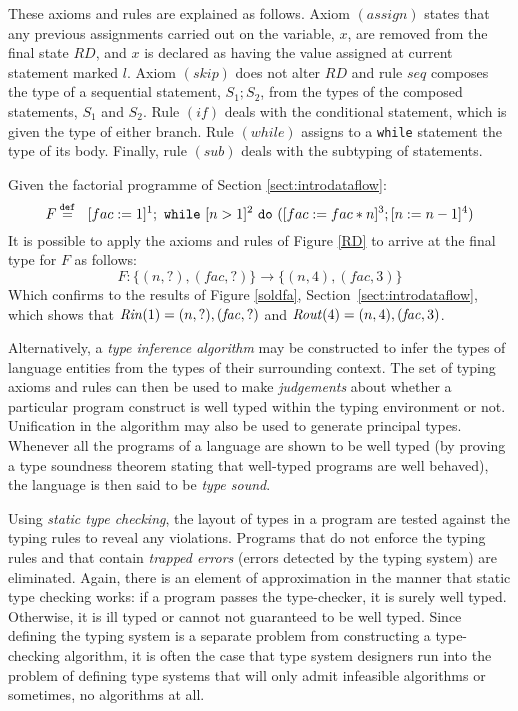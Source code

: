 \documentclass[10pt,a4paper,final,oneside,fleqn]{book}
\newcommand*{\eqdef}{\mathbin{\mathop{=}\limits^{\texttt{def}}}}
\begin{document}
These axioms and rules are explained as follows. Axiom $(assign)$ states that any previous assignments carried out on the variable, $x$, are removed from the final state $RD$, and $x$ is declared as having the value assigned at current statement marked $l$.  Axiom $(skip)$ does not alter $RD$ and rule $seq$ composes the type of a sequential statement, $S_1;S_2$, from the types of the composed statements, $S_1$ and $S_2$. Rule $(if)$ deals with the conditional statement, which is given the type of either branch.  Rule $(while)$ assigns to a \texttt{while} statement the type of its body. Finally, rule $(sub)$ deals with the subtyping of statements.

Given the factorial programme of Section \ref{sect:introdataflow}:
\begin{equation*}
F\eqdef~~[fac:=1]^1;\mbox{ \texttt{while} }[n>1]^2\mbox{ \texttt{do} }([fac:=fac*n]^3;[n:=n-1]^4)
\end{equation*}
It is possible to apply the axioms and rules of Figure \ref{RD} to arrive at the final type for $F$ as follows:
\[F:\{(n,?),(fac,?)\}\to\{(n,4),(fac,3)\}\]
Which confirms to the results of Figure \ref{soldfa}, Section~\ref{sect:introdataflow}, which shows that $\mbox{{\itshape Rin\/}}(1)=(n,?), (\mbox{{\itshape fac\/}},?)$ and $\mbox{{\itshape Rout\/}}(4)=(n,4), (\mbox{{\itshape fac\/}},3)$.

Alternatively, a {\itshape type inference algorithm\/} may be constructed to infer the types of language entities from the types of their surrounding context. The set of typing axioms and rules can then be used to make {\itshape judgements\/} about whether a particular program construct is well typed within the typing environment or not.  Unification in the algorithm may also be used to generate principal types.  Whenever all the programs of a language are shown to be well typed (by proving a type soundness theorem stating that well-typed programs are well behaved), the language is then said to be {\itshape type sound\/}.

Using {\itshape static type checking\/}, the layout of types in a program are tested against the typing rules to reveal any violations.  Programs that do not enforce the typing rules and that contain {\itshape trapped errors\/} (errors detected by the typing system) are eliminated.  Again, there is an element of approximation in the manner that static type checking works: if a program passes the type-checker, it is surely well typed.  Otherwise, it is ill typed or cannot not guaranteed to be well typed.  Since defining the typing system is a separate problem from constructing a type-checking algorithm, it is often the case that type system designers run into the problem of defining type systems that will only admit infeasible algorithms or sometimes, no algorithms at all.
\end{document}
